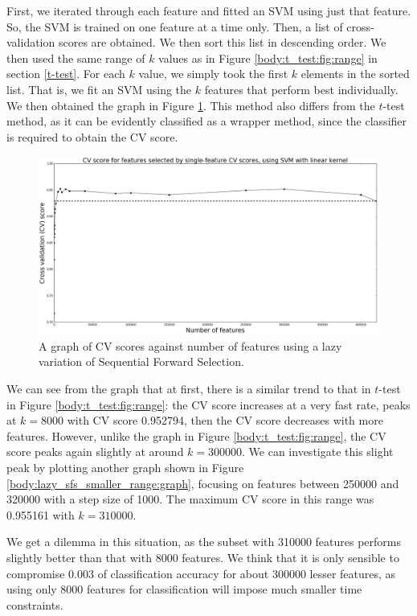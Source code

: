 \documentclass[12pt, twoside, a4paper]{report}
\begin{document}
First, we iterated through each feature and fitted an SVM using just that feature. So, the SVM is trained on one feature at a time only. Then, a list of cross-validation scores are obtained. We then sort this list in descending order. We then used the same range of $k$ values as in Figure \ref{body:t_test:fig:range} in section \ref{t-test}. For each $k$ value, we simply took the first $k$ elements in the sorted list. That is, we fit an SVM using the $k$ features that perform best individually. We then obtained the graph in Figure \ref{body:lazy_sfs:graph}. This method also differs from the $t$-test method, as it can be evidently classified as a wrapper method, since the classifier is required to obtain the CV score.

\begin{figure}
\centering
\includegraphics[width=\textwidth]{images/lazy_sfs_range.jpeg}
\caption{A graph of CV scores against number of features using a lazy variation of Sequential Forward Selection.}
\label{body:lazy_sfs:graph}
\end{figure}

We can see from the graph that at first, there is a similar trend to that in $t$-test in Figure \ref{body:t_test:fig:range}: the CV score increases at a very fast rate, peaks at $k=8000$ with CV score 0.952794, then the CV score decreases with more features. However, unlike the graph in Figure \ref{body:t_test:fig:range}, the CV score peaks again slightly at around $k=300000$. We can investigate this slight peak by plotting another graph shown in Figure \ref{body:lazy_sfs_smaller_range:graph}, focusing on features between 250000 and 320000 with a step size of 1000. The maximum CV score in this range was 0.955161 with $k=310000$.

We get a dilemma in this situation, as the subset with 310000 features performs slightly better than that with 8000 features. We think that it is only sensible to compromise 0.003 of classification accuracy for about 300000 lesser features, as using only 8000 features for classification will impose much smaller time constraints.
\end{document}
